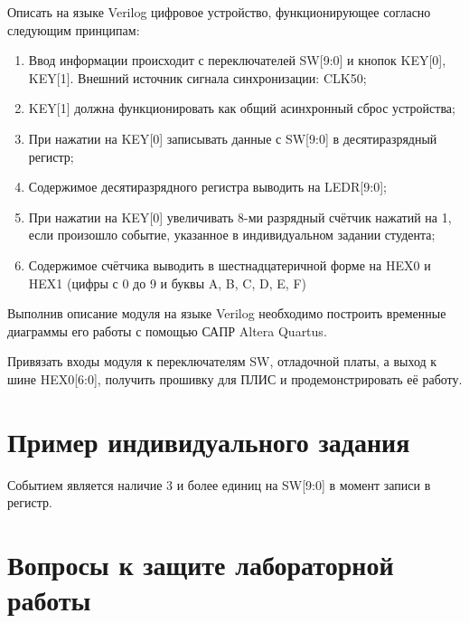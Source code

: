 \documentclass[a5paper, DIV=14, headings=openany, twoside=true,fontsize=10pt, titlepage]{scrreprt}
\newcommand{\eng}[1]{\foreignlanguage{english}{#1}}
\begin{document}
\par{Описать на языке \eng{Verilog} цифровое устройство, функционирующее согласно следующим принципам:
\begin{enumerate}[noitemsep,topsep=0pt, after=\vspace{2pt}]
  \item Ввод информации происходит с переключателей \eng{SW}[9:0] и кнопок \eng{KEY}[0], \eng{KEY}[1]. Внешний источник сигнала синхронизации: \eng{CLK}50;
  \item \eng{KEY}[1] должна функционировать как общий асинхронный сброс устройства;
  \item При нажатии на \eng{KEY}[0] записывать данные с \eng{SW}[9:0] в десятиразрядный регистр;
  \item Содержимое десятиразрядного регистра выводить на \eng{LEDR}[9:0];
  \item При нажатии на \eng{KEY}[0] увеличивать 8-ми разрядный счётчик нажатий на 1, если произошло событие, указанное в индивидуальном задании студента;
  \item Содержимое счётчика выводить в шестнадцатеричной форме на \eng{HEX}0 и \eng{HEX}1 (цифры с 0 до 9 и буквы \eng{A}, \eng{B}, \eng{C}, \eng{D}, \eng{E}, \eng{F})
\end{enumerate}}
		
\par{Выполнив описание модуля на языке \eng{Verilog} необходимо построить временные диаграммы его работы с помощью САПР \eng{Altera Quartus}.}		
		
\par{Привязать входы модуля к переключателям \eng{SW}, отладочной платы, а выход к шине \eng{HEX}0[6:0], получить прошивку для ПЛИС и продемонстрировать её работу.}
		
\section{Пример индивидуального задания}

\par{Событием является наличие 3 и более единиц на SW[9:0] в момент записи в регистр.}


		
\section{Вопросы к защите лабораторной работы}
\end{document}
